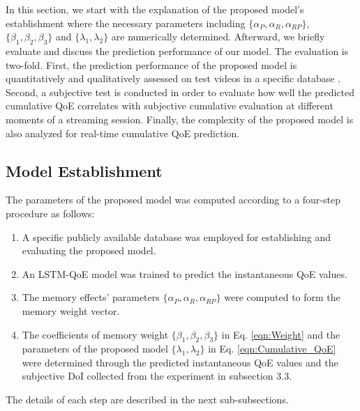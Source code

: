 In this section, we start with the explanation of the proposed model's establishment where the necessary parameters including $\{\alpha_{P}, \alpha_{R}, \alpha_{RP}\}$, ${\{\beta_{1}, \beta_{2}, \beta_{3}\}}$ and $\{\lambda_{1}, \lambda_{2} \}$ are numerically determined. Afterward, we briefly evaluate and discuss the prediction performance of our model. The evaluation is two-fold. First, the prediction performance of the proposed model is quantitatively and qualitatively assessed on test videos in a specific database \cite{LFOVIA}. Second, a subjective test is conducted in order to evaluate how well the predicted cumulative QoE correlates with subjective cumulative evaluation at different moments of a streaming session. Finally, the complexity of the proposed model is also analyzed for real-time cumulative QoE prediction.


\subsection{Model Establishment}
\label{section:Training}

  The parameters of the proposed model was computed according to a four-step procedure as follows: 
 
  \begin{enumerate}[label=\arabic*)]
    \item A specific publicly available database was employed for establishing and evaluating the proposed model. 
    \item An LSTM-QoE model \cite{QoEModel_LSTM} was trained to predict the instantaneous QoE values.
    \item The memory effects' parameters $\{ \alpha_{P}, \alpha_{R}, \alpha_{RP} \}$ were computed to form the memory weight vector.
    \item The coefficients of memory weight ${\{\beta_{1}, \beta_{2}, \beta_{3}\}}$ in Eq. \ref{eqn:Weight} and the parameters of the proposed model $\{ \lambda_{1}, \lambda_{2} \}$ in Eq. \ref{eqn:Cumulative_QoE} were determined through the predicted instantaneous QoE values and the subjective DoI collected from the experiment in subsection 3.3.
  \end{enumerate}
  The details of each step are described in the next sub-subsections.
  
  
